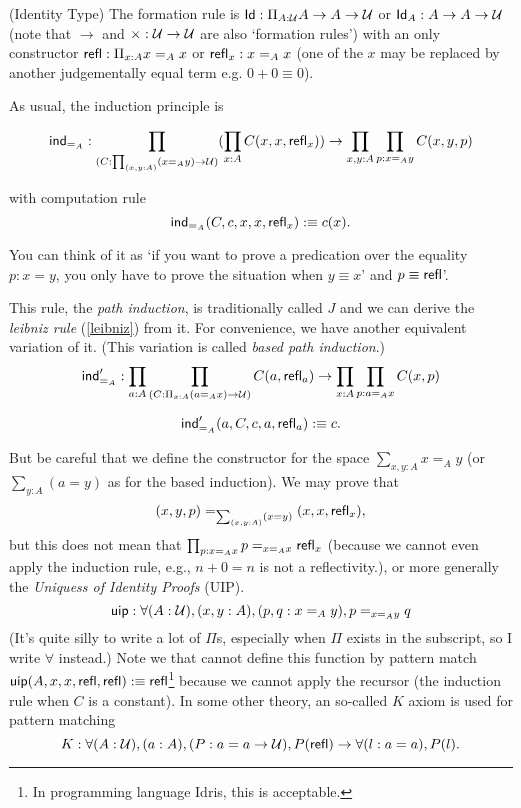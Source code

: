 \begin{definition}
    \label{identity-type}
    (Identity Type) The formation rule is 
    $\text{\sf Id}: \Pi_{A:\mathcal{U}}A\to A\to\mathcal{U}$ or $\text{\sf Id}_A: A\to A\to \mathcal{U}$ 
    (note that $\to$ and $\times: \mathcal{U}\to\mathcal{U}$ are also 
    `formation rules') with an only constructor 
    $\text{\sf refl}:\Pi_{x:A}x=_A x$ or $\text{\sf refl}_x: x=_A x$ (one of the $x$ may
    be replaced by another judgementally equal term e.g. $0+0\equiv 0$).
\end{definition}

As usual, the induction principle is

\begin{equation}
    \label{ind_id}
    \text{\sf ind}_{=_A}:\prod_{(C:\prod_{(x,y:A)}(x=_A y)\to\mathcal{U})}
    (\prod_{x:A}C(x,x,\text{\sf refl}_x))\to\prod_{x,y:A}\prod_{p:x=_A y}C(x,y,p)
\end{equation}

with computation rule
$$
    \text{\sf ind}_{=_A}(C,c,x,x,\text{\sf refl}_x):\equiv c(x).
$$

You can think of it as `if you want to prove a predication over
the equality $p: x=y$, you only have to prove the situation when 
$y\equiv x$' and $p\equiv \text{\sf refl}$'.

This rule, the {\it path induction}, is traditionally called $J$ and we 
can derive the {\it leibniz rule} (\autoref{leibniz}) from it. For 
convenience, we have another equivalent variation of it. (This variation 
is called {\it based path induction}.)
$$
    \text{\sf ind}'_{=_A}:\prod_{a:A}\prod_{(C:\Pi_{x:A}(a=_A x)\to \mathcal{U})}
    C(a, \text{\sf refl}_a) \to \prod_{x:A}\prod_{p:a=_A x}C(x, p)
$$

$$
    \text{\sf ind}'_{=_A}(a, C, c, a,\text{\sf refl}_a) :\equiv c.
$$

But be careful that we define the constructor for the space 
$\sum_{x,y:A}x=_A y$ (or $\sum_{y:A}(a=y)$ as for the based induction).
We may prove that $$(x,y,p)=_{\sum_{(x,y:A)}(x=y)}(x,x,\text{\sf refl}_x),$$ but
this does not mean that $\prod_{p:x=_A x}p=_{x=_Ax}\text{\sf refl}_x$ (because
we cannot even apply the induction rule, e.g., $n+0=n$ is not a 
reflectivity.), or more generally the {\it
Uniquess of Identity Proofs} (UIP).
\newcommand{\uip}{\name{uip}}
\begin{equation}
    \label{uip}
    \uip: \forall (A: \universe), (x,y:A), (p,q:x=_A y),p=_{x=_A y}q
\end{equation}
(It's quite silly to write a lot of $\Pi$s, especially when $\Pi$ exists
in the subscript, so I write $\forall$ instead.)
Note we that cannot define this function by pattern match 
$\uip(A,x,x,\refl,\refl)\defn\refl$\footnote{In programming language
Idris, this is acceptable.} because we cannot apply the recursor (the
induction rule when $C$ is a constant). In some other theory, an
so-called $K$ axiom is used for pattern matching \cite{pattern-matching-without-K}
\begin{equation}
    \label{K-axiom}
    K: \forall (A:\mathcal{U}), (a:A), (P: a=a\to\mathcal{U}),
    P(\text{\sf refl})\to\forall (l: a = a), P(l).
\end{equation}

